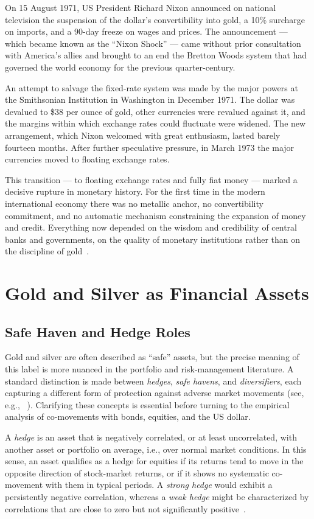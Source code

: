 On 15 August 1971, US President Richard Nixon announced on national television the suspension of the dollar's convertibility into gold, a 10\% surcharge on imports, and a 90-day freeze on wages and prices. The announcement --- which became known as the ``Nixon Shock'' --- came without prior consultation with America's allies and brought to an end the Bretton Woods system that had governed the world economy for the previous quarter-century.

An attempt to salvage the fixed-rate system was made by the major powers at the Smithsonian Institution in Washington in December 1971. The dollar was devalued to \$38 per ounce of gold, other currencies were revalued against it, and the margins within which exchange rates could fluctuate were widened. The new arrangement, which Nixon welcomed with great enthusiasm, lasted barely fourteen months. After further speculative pressure, in March 1973 the major currencies moved to floating exchange rates.

This transition --- to floating exchange rates and fully fiat money --- marked a decisive rupture in monetary history. For the first time in the modern international economy there was no metallic anchor, no convertibility commitment, and no automatic mechanism constraining the expansion of money and credit. Everything now depended on the wisdom and credibility of central banks and governments, on the quality of monetary institutions rather than on the discipline of gold~\cite{Eichengreen1996,Mishkin2019}.
\section{Gold and Silver as Financial Assets}
\subsection{Safe Haven and Hedge Roles}

Gold and silver are often described as ``safe'' assets, but the precise meaning of this
label is more nuanced in the portfolio and risk-management literature. A standard
distinction is made between \emph{hedges}, \emph{safe havens}, and \emph{diversifiers},
each capturing a different form of protection against adverse market movements (see, e.g.,
~\cite{BaurLucey2010,ErbHarvey2013}). Clarifying these concepts is essential before
turning to the empirical analysis of co-movements with bonds, equities, and the US dollar.

A \emph{hedge} is an asset that is negatively correlated, or at least uncorrelated, with
another asset or portfolio on average, i.e., over normal market conditions. In this sense,
an asset qualifies as a hedge for equities if its returns tend to move in the opposite
direction of stock-market returns, or if it shows no systematic co-movement with them in
typical periods. A \emph{strong hedge} would exhibit a persistently negative correlation,
whereas a \emph{weak hedge} might be characterized by correlations that are close to zero
but not significantly positive~\cite{BaurLucey2010}.

